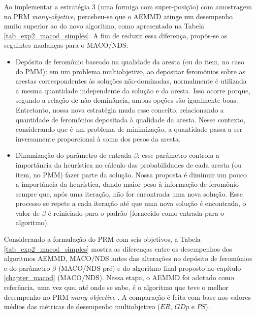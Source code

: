 Ao implementar a estratégia 3 (uma formiga com super-posição) com amostragem no PRM \textit{many-objetive}, percebeu-se que o AEMMD atinge um desempenho muito superior ao do novo algoritmo, como apresentado na Tabela \ref{tab_exp2_macod_simples}. A fim de reduzir essa diferença, propôs-se as seguintes mudanças para o MACO/NDS:

\begin{itemize}
	\item Depósito de feromônio baseado na qualidade da aresta (ou do item, no caso do PMM): em um problema multiobjetivo, ao depositar feromônios sobre as arestas correspondentes às soluções não-dominadas, normalmente é utilizada a mesma quantidade independente da solução e da aresta. Isso ocorre porque, segundo a relação de não-dominância, ambas opções são igualmente boas. Entretanto, nossa nova estratégia muda esse conceito, relacionando a quantidade de feromônios depositada à qualidade da aresta. Nesse contexto, considerando que é um problema de minimização, a quantidade passa a ser inversamente proporcional à soma dos pesos da aresta.
	\item Dinamização do parâmetro de entrada $\beta$: esse parâmetro controla a importância da heurística no cálculo das probabilidades de cada aresta (ou item, no PMM) fazer parte da solução. Nossa proposta é diminuir um pouco a importância da heurística, dando maior peso à informação de feromônio sempre que, após uma iteração, não for encontrada uma nova solução. Esse processo se repete a cada iteração até que uma nova solução é encontrada, o valor de $\beta$ é reiniciado para o padrão (fornecido como entrada para o algoritmo).
\end{itemize}

Considerando a formulação do PRM com seis objetivos, a Tabela \ref{tab_exp2_macod_simples} mostra as diferenças entre os desempenhos dos algoritmos AEMMD, MACO/NDS antes das alterações no depósito de feromônios e do parâmetro $\beta$ (MACO/NDS-pré) e do algoritmo final proposto no capítulo \ref{chapter_macod} (MACO/NDS). Nessa etapa, o AEMMD foi adotado como referência, uma vez que, até onde se sabe, é o algoritmo que teve o melhor desempenho no PRM \textit{many-objective} \cite{LafetaThesis}. A comparação é feita com base nos valores médios das métricas de desempenho multiobjetivo ($ER$, $GDp$ e $PS$).


